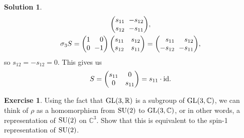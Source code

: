 \documentclass[11pt, a4paper]{report}
\theoremstyle{definition}
\newtheorem{exercise}{Exercise}[part]
\newtheorem{solution}{Solution}[part]
\newenvironment{ex}{\begin{exercise}}{\end{exercise}\pagebreak[1]}
\newenvironment{sol}{\begin{solution}}{\end{solution}\pagebreak[3]}
\newcommand*{\settightmatrix}{\ensuremath\setlength{\arraycolsep}{0.7ex}}
\newenvironment{tightmatrix}
    {\settightmatrix}{}
\newcommand*{\GL}{\ensuremath\text{GL}}
\newcommand*{\SU}{\ensuremath\text{SU}}
\newcommand*{\op}[1]{\ensuremath\mathop{}\mathopen{}#1}
\newcommand*{\id}{\op{\mathrm{id}}}
\begin{document}
\begin{sol}
\begin{gather*}
\begin{tightmatrix}
\begin{pmatrix*}[r]
            s_{11} & -s_{12} \\
            s_{12} & -s_{11}
        \end{pmatrix*}\end{tightmatrix}, \\
    \sigma_3 S =
        \begin{tightmatrix}\begin{pmatrix*}[r]
            1 &  0 \\
            0 & -1
        \end{pmatrix*}\end{tightmatrix}
        \begin{pmatrix}
            s_{11} & s_{12} \\
            s_{12} & s_{11}
        \end{pmatrix}
        =
        \begin{tightmatrix}\begin{pmatrix*}[r]
            s_{11}  & s_{12} \\
            -s_{12} & -s_{11}
        \end{pmatrix*}\end{tightmatrix},
\end{gather*}
so $s_{12} = -s_{12} = 0$. This gives us
\[
    S = \begin{pmatrix}
            s_{11} & 0 \\
            0      & s_{11}
        \end{pmatrix}
        = s_{11} \cdot \id.
\]

\end{sol}

\begin{ex}

Using the fact that $\GL(3, \mathbb{R})$ is a subgroup of $\GL(3, \mathbb{C})$, we can think of $\rho$ as a homomorphism from $\SU(2)$ to $\GL(3, \mathbb{C})$, or in other words, a representation of $\SU(2)$ on $\mathbb{C}^3$.
Show that this is equivalent to the spin-1 representation of $\SU(2)$.

\end{ex}
\end{document}
